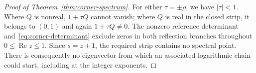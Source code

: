 \begin{proof}[Proof of Theorem~\ref{thm:corner-spectrum}]
For either $\tau=\pm\rho$, we have $|\tau|<1$. Where $Q$ is nonreal, $1+\tau Q$ cannot vanish; where $Q$ is real in the closed strip, it belongs to $(0,1)$ and again $1+\tau Q\neq0$. The nonzero reference determinant and~\eqref{eq:corner-determinant} exclude zeros in both reflection branches throughout $0\leq\operatorname{Re}z\leq1$. Since $s=z+1$, the required strip contains no spectral point. There is consequently no eigenvector from which an associated logarithmic chain could start, including at the integer exponents.
\end{proof}
